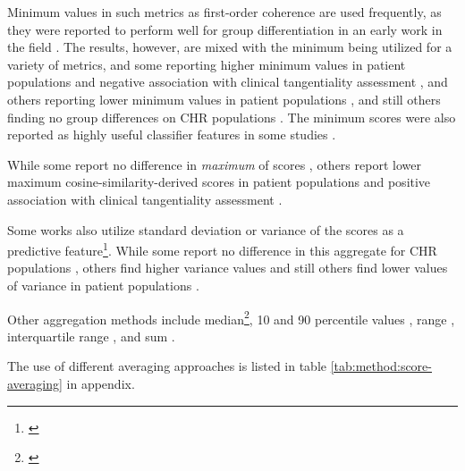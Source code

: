 Minimum values in such metrics as first-order coherence are used frequently, as they were reported to perform well for group differentiation in an early work in the field \citep{bedi2015automated}. The results, however, are mixed with the minimum being utilized for a variety of metrics, and some reporting higher minimum values in patient populations \citep{panicheva2019semantic, corona2022assessing} and negative association with clinical tangentiality assessment \citep{bilgrami2022construct}, and others reporting lower minimum values in patient populations \citep{bedi2015automated, corcoran2018prediction, iter2018automatic, ryazanskaya2020automated}, and still others finding no group differences on CHR populations \citep{haas2020linking, bilgrami2022construct}. The minimum scores were also reported as highly useful classifier features in some studies \citep{bedi2015automated, xu2020centroid, xu2022fully, sarzynska2021detecting}.

While some report no difference in \textit{maximum} of scores \citep{haas2020linking, morgan2021natural, voppel2021quantified, bilgrami2022construct}, others report lower maximum cosine-similarity-derived scores in patient populations \citep{corcoran2018prediction, panicheva2019semantic, ryazanskaya2020thesis, corona2022assessing} and positive association with clinical tangentiality assessment \citep{bilgrami2022construct}.

Some works also utilize standard deviation or variance of the scores as a predictive feature\footnote{\cite{bedi2015automated, corcoran2018prediction, panicheva2019semantic, haas2020linking, hitczenko2021understanding, sarzynska2021detecting, voppel2021quantified, corona2022assessing, voppel2023semantic}}. While some report no difference in this aggregate for CHR populations \citep{haas2020linking, hitczenko2021understanding}, others find higher variance values \citep{voppel2021quantified, voppel2023semantic} and still others find lower values of variance in patient populations \citep{corcoran2018prediction}.

Other aggregation methods include median\footnote{\cite{bedi2015automated, sarzynska2021detecting, corona2022assessing, parola2022speech}}, 10 and 90 percentile values \citep{corcoran2018prediction, panicheva2019semantic}, range \citep{corona2022assessing}, interquartile range \citep{parola2022speech}, and sum \citep{jeong2023exploring}.

The use of different averaging approaches is listed in table \ref{tab:method:score-averaging} in appendix.

